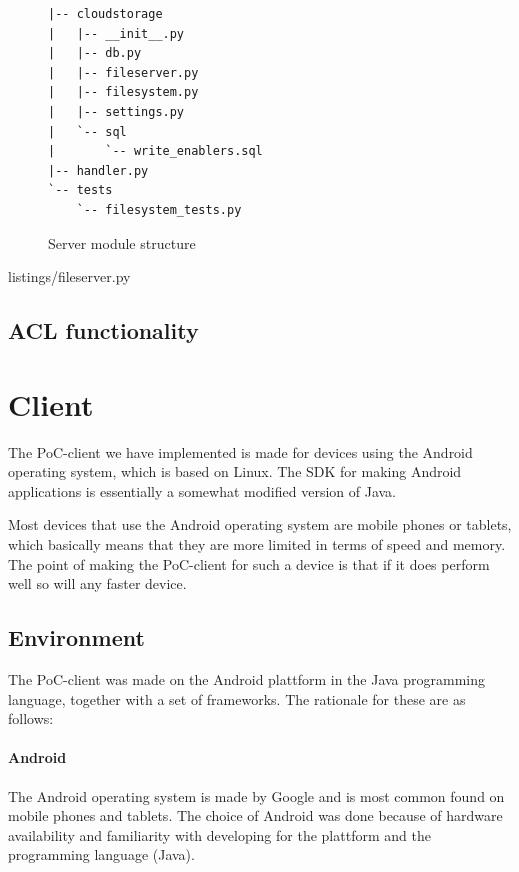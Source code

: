 \documentclass[pdftex,english,10pt,b5paper,twoside]{book}
\begin{document}
\begin{figure}[h!]
\begin{verbatim}
|-- cloudstorage
|   |-- __init__.py
|   |-- db.py
|   |-- fileserver.py
|   |-- filesystem.py
|   |-- settings.py
|   `-- sql
|       `-- write_enablers.sql
|-- handler.py
`-- tests
    `-- filesystem_tests.py
\end{verbatim}
    \caption{Server module structure}
    \label{fig:IM:layout}
\end{figure}


{listings/fileserver.py}

\subsection{ACL functionality}


\section{Client}
%
The \ac{PoC}-client we have implemented is made for devices using the Android
operating system, which is based on Linux. The SDK for making Android
applications is essentially a somewhat modified version of Java. 

Most devices that use the Android operating system are mobile phones or
tablets, which basically means that they are more limited in terms of speed and
memory. The point of making the \ac{PoC}-client for such a device is that if it
does perform well so will any faster device.

\subsection{Environment}
The \ac{PoC}-client was made on the Android plattform in the Java programming
language, together with a set of frameworks. The rationale for these are as
follows:

\paragraph{Android} The Android operating system is made by Google and is most
common found on mobile phones and tablets. The choice of Android was done
because of hardware availability and familiarity with developing for the
plattform and the programming language (Java). 
\end{document}
